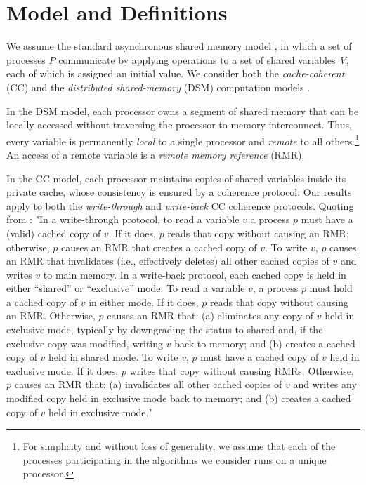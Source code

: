 
\section{Model and Definitions}
\label{sec:model}
We assume the standard asynchronous shared memory model \cite{HerlihyWingLinearizability}, in which a set of processes $P$ communicate by applying operations to a set of shared variables \emph{V}, each of which is assigned an initial value.
We consider both the \emph{cache-coherent} (CC) and the \emph{distributed shared-memory} (DSM) computation models \cite{jand:surv}.

In the DSM model, each processor owns a segment of shared memory that can be locally accessed without traversing the processor-to-memory interconnect. Thus, every variable is permanently \textit{local} to a single processor and \emph{remote} to all others.\footnote{For simplicity and without loss of generality, we assume that each of the processes participating in the algorithms we consider runs on a unique processor.}
An access of a remote variable is a \emph{remote memory reference} (RMR).

In the CC model, each processor maintains copies of shared variables inside its private cache, whose consistency is ensured by a coherence protocol. Our results apply to both the \textit{write-through} and \textit{write-back} \cite{DBLP:books/mk/PattersonH94} CC coherence protocols.
Quoting from \cite{DBLP:conf/podc/GolabHHW07}: "In a write-through protocol, to read a variable $v$ a process $p$ must have a (valid) cached copy of $v$. If it does, $p$ reads that copy without causing an RMR; otherwise, $p$ causes an RMR that creates a cached copy of $v$. To write $v$, $p$ causes an RMR that invalidates (i.e., effectively deletes) all other cached copies of $v$ and writes $v$ to main memory. In a write-back protocol, each cached copy is held in either “shared” or “exclusive” mode. To read a variable $v$, a process $p$ must hold a cached copy of $v$ in either mode. If it does, $p$ reads that copy without causing an RMR. Otherwise, $p$ causes an RMR that: (a) eliminates any copy of $v$ held in exclusive mode, typically by downgrading the status to shared and, if the exclusive copy was modiﬁed, writing $v$ back to memory; and (b) creates a cached copy of $v$ held in shared mode. To write $v$, $p$ must have a cached copy of $v$ held in exclusive mode. If it does, $p$ writes that copy without causing RMRs. Otherwise, $p$ causes an RMR that: (a) invalidates all other cached copies of $v$ and writes any modiﬁed copy held in exclusive mode back to memory; and (b) creates a cached copy of $v$ held in exclusive mode."


